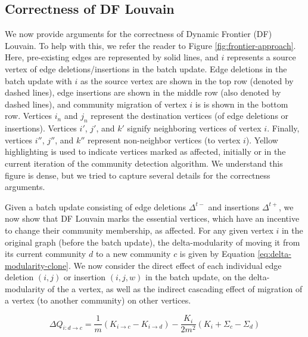 




\subsection{Correctness of DF Louvain}
\label{sec:louvain-correctness}

We now provide arguments for the correctness of Dynamic Frontier (DF) Louvain. To help with this, we refer the reader to Figure \ref{fig:frontier-approach}. Here, pre-existing edges are represented by solid lines, and $i$ represents a source vertex of edge deletions/insertions in the batch update. Edge deletions in the batch update with $i$ as the source vertex are shown in the top row (denoted by dashed lines), edge insertions are shown in the middle row (also denoted by dashed lines), and community migration of vertex $i$ is is shown in the bottom row. Vertices $i_n$ and $j_n$ represent the destination vertices (of edge deletions or insertions). Vertices $i'$, $j'$, and $k'$ signify neighboring vertices of vertex $i$. Finally, vertices $i''$, $j''$, and $k''$ represent non-neighbor vertices (to vertex $i$). Yellow highlighting is used to indicate vertices marked as affected, initially or in the current iteration of the community detection algorithm. We understand this figure is dense, but we tried to capture several details for the correctness arguments.

Given a batch update consisting of edge deletions $\Delta^{t-}$ and insertions $\Delta^{t+}$, we now show that DF Louvain marks the essential vertices, which have an incentive to change their community membership, as affected. For any given vertex $i$ in the original graph (before the batch update), the delta-modularity of moving it from its current community $d$ to a new community $c$ is given by Equation \ref{eq:delta-modularity-clone}. We now consider the direct effect of each individual edge deletion $(i, j)$ or insertion $(i, j, w)$ in the batch update, on the delta-modularity of the a vertex, as well as the indirect cascading effect of migration of a vertex (to another community) on other vertices.

\begin{equation}
\label{eq:delta-modularity-clone}
  \Delta Q_{i: d \rightarrow c}
  = \frac{1}{m} (K_{i \rightarrow c} - K_{i \rightarrow d}) - \frac{K_i}{2m^2} (K_i + \Sigma_c - \Sigma_d)
\end{equation}

